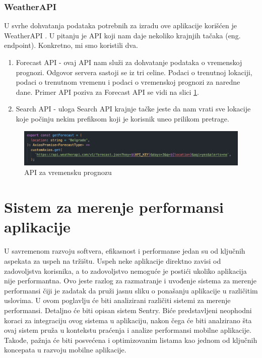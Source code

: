 \documentclass[12pt,oneside]{memoir}
\begin{document}
\subsection{WeatherAPI}

U svrhe dohvatanja podataka potrebnih za izradu ove aplikacije korišćen je WeatherAPI \cite{WeatherAPI}. U pitanju je API koji nam daje nekoliko krajnjih tačaka (eng. endpoint). Konkretno, mi smo koristili dva. 

\begin{enumerate}
    \item Forecast API - ovaj API nam služi za dohvatanje podataka o vremenskoj prognozi. Odgovor servera sastoji se iz tri celine. Podaci o trenutnoj lokaciji, podaci o trenutnom vremenu i podaci o vremenskoj prognozi za naredne dane. Primer API poziva za Forecast API se vidi na slici \ref{fig:forecastAPI}.
    \item Search API - uloga Search API krajnje tačke jeste da nam vrati sve lokacije koje počinju nekim prefiksom koji je korisnik uneo prilikom pretrage. 
\end{enumerate}

\newpage

\begin{figure}[h]
    \centering
    \includegraphics[scale=0.5]{docs/images/chapterFour/forecastAPI.png}
    \caption{API za vremensku prognozu}
    \label{fig:forecastAPI}
\end{figure}

\chapter{Sistem za merenje performansi aplikacije}

U savremenom razvoju softvera, efikasnost i performanse jedan su od ključnih aspekata za uspeh na tržištu. Uspeh neke aplikacije direktno zavisi od zadovoljstva korisnika, a to zadovoljstvo nemoguće je postići ukoliko aplikacija nije performantna. Ovo jeste razlog za razmatranje i uvođenje sistema za merenje performansi čiji je zadatak da pruži jasnu sliku o ponašanju aplikacije u različitim uslovima. 
\newline
U ovom poglavlju će biti analizirani različiti sistemi za merenje performansi. Detaljno će biti opisan sistem Sentry\cite{Sentry}. Biće predstavljeni neophodni koraci za integraciju ovog sistema u aplikaciju, nakon čega će biti analzirano šta ovaj sistem pruža u kontekstu praćenja i analize performansi mobilne aplikacije. Takođe, pažnja će biti posvećena i optimizovanim listama kao jednom od ključnih koncepata u razvoju mobilne aplikacije.
\end{document}
